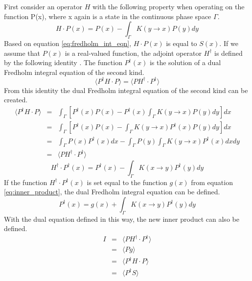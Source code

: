 First consider an operator $H$ with the following property when operating
on the function P(x), where x again is a state in the continuous phase space
$\Gamma$. 
\begin{equation}
  H \cdot P(x) = P(x) - \int_{\Gamma} K(y \to x)P(y)dy
  \label{eq:forward_operator}
\end{equation}
Based on equation \ref{eq:fredholm_int_eqn}, $H \cdot P(x)$ is equal to $S(x)$.
If we assume that $P(x)$ is a real-valued function, the adjoint operator 
$H^{\dagger}$ is defined by the following identity 
\citep{lewis_computational_1993}. The function $P^{\dagger}(x)$ is the solution 
of a dual Fredholm integral equation of the second kind. 
\begin{equation}
  \langle P^{\dagger}H \cdot P \rangle = 
  \langle PH^{\dagger} \cdot P^{\dagger} \rangle
  \label{eq:forward_adjoint_ops}
\end{equation}
From this identity the dual Fredholm integral equation of the second kind can
be created.
\begin{eqnarray}
  \langle P^{\dagger}H \cdot P \rangle & = & \int_{\Gamma} \left[P^{\dagger}(x)P(x) -
  P^{\dagger}(x)\int_{\Gamma}K(y \to x)P(y)dy \right]dx \nonumber \\
  & = & \int_{\Gamma} \left[P^{\dagger}(x)P(x) -
  \int_{\Gamma}K(y \to x)P^{\dagger}(x)P(y)dy \right]dx \nonumber \\
  & = & \int_{\Gamma} P(x)P^{\dagger}(x)dx - 
  \int_{\Gamma}P(y)\int_{\Gamma}K(y \to x)P^{\dagger}(x)dxdy \nonumber \\
  & = & \langle PH^{\dagger} \cdot P^{\dagger} \rangle \nonumber
\end{eqnarray}
\begin{equation}
  H^{\dagger} \cdot P^{\dagger}(x) = P^{\dagger}(x) - 
  \int_{\Gamma}K(x \to y)P^{\dagger}(y)dy
  \label{eq:adjoint_operator}
\end{equation}
If the function $H^{\dagger} \cdot P^{\dagger}(x)$ is set equal to the function
$g(x)$ from equation \ref{eq:inner_product}, the dual Fredholm integral
equation can be defined.
\begin{equation}
  P^{\dagger}(x) = g(x) + \int_{\Gamma}K(x \to y)P^{\dagger}(y)dy
  \label{eq:dual_fredholm_int_eqn}
\end{equation}
With the dual equation defined in this way, the new inner product can also
be defined.
\begin{eqnarray}
  I & = & \langle PH^{\dagger} \cdot P^{\dagger} \rangle \nonumber \\
  & = & \langle Pg \rangle \nonumber \\
  & = & \langle P^{\dagger}H \cdot P \rangle \nonumber \\
  & = & \langle P^{\dagger}S \rangle
\end{eqnarray}
